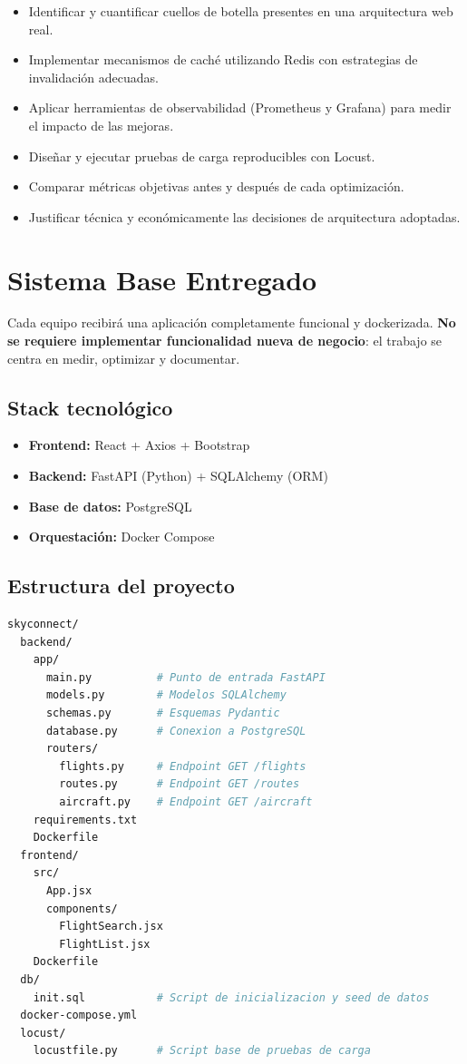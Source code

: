 \documentclass[12pt,a4paper]{article}
\begin{document}
\begin{itemize}
  \item Identificar y cuantificar cuellos de botella presentes en una arquitectura web real.
  \item Implementar mecanismos de caché utilizando Redis con estrategias de invalidación adecuadas.
  \item Aplicar herramientas de observabilidad (Prometheus y Grafana) para medir el impacto de las mejoras.
  \item Diseñar y ejecutar pruebas de carga reproducibles con Locust.
  \item Comparar métricas objetivas antes y después de cada optimización.
  \item Justificar técnica y económicamente las decisiones de arquitectura adoptadas.
\end{itemize}

\section{Sistema Base Entregado}

Cada equipo recibirá una aplicación completamente funcional y dockerizada. \textbf{No se requiere implementar funcionalidad nueva de negocio}: el trabajo se centra en medir, optimizar y documentar.

\subsection{Stack tecnológico}

\begin{itemize}
  \item \textbf{Frontend:} React + Axios + Bootstrap
  \item \textbf{Backend:} FastAPI (Python) + SQLAlchemy (ORM)
  \item \textbf{Base de datos:} PostgreSQL
  \item \textbf{Orquestación:} Docker Compose
\end{itemize}

\subsection{Estructura del proyecto}

\begin{lstlisting}[language=bash, caption={Estructura de directorios del sistema base}]
skyconnect/
  backend/
    app/
      main.py          # Punto de entrada FastAPI
      models.py        # Modelos SQLAlchemy
      schemas.py       # Esquemas Pydantic
      database.py      # Conexion a PostgreSQL
      routers/
        flights.py     # Endpoint GET /flights
        routes.py      # Endpoint GET /routes
        aircraft.py    # Endpoint GET /aircraft
    requirements.txt
    Dockerfile
  frontend/
    src/
      App.jsx
      components/
        FlightSearch.jsx
        FlightList.jsx
    Dockerfile
  db/
    init.sql           # Script de inicializacion y seed de datos
  docker-compose.yml
  locust/
    locustfile.py      # Script base de pruebas de carga
\end{lstlisting}
\end{document}
